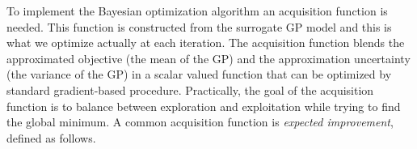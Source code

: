

To implement the Bayesian optimization algorithm an acquisition function is needed. This function is constructed from the surrogate GP model and this is what we optimize actually at each iteration. The acquisition function blends the approximated objective (the mean of the GP) and the approximation uncertainty (the variance of the GP) in a scalar valued function that can be optimized by standard gradient-based procedure. Practically, the goal of the acquisition function is to balance between exploration and exploitation while trying to find the global minimum. A common acquisition function is \textit{expected improvement}, defined as follows. 

